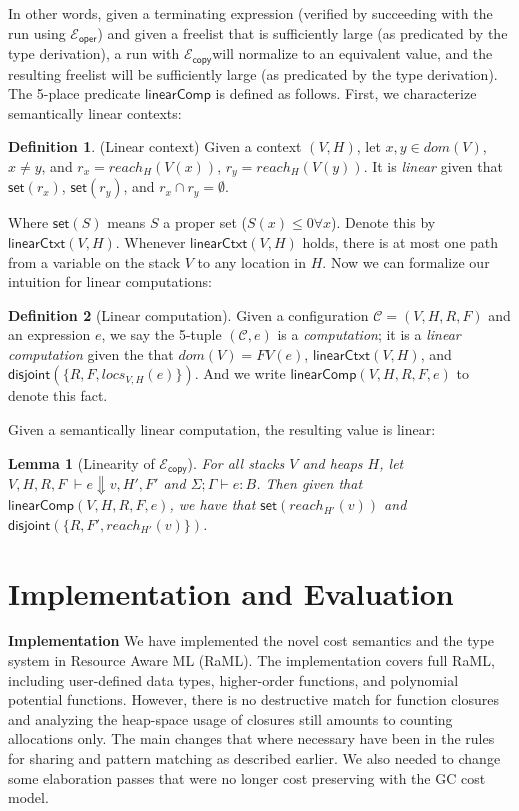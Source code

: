 \documentclass{easychair}
\newcommand{\ms}[1]{\ensuremath{\mathsf{#1}}}
\newcounter{rule}
\newcommand{\na}[1]{\mathsf{linearCtxt}(#1)}
\newcommand{\dist}[1]{\mathsf{disjoint}(#1)}
\newcommand{\wfc}[5]{\mathsf{linearComp}(#1,#2,#3,#4,#5)}
\newcommand{\copySem}{\ensuremath{\mathcal{E}_{\ms{copy}}}}
\newtheorem{lemma}[theorem]{Lemma}
\theoremstyle{definition}
\newtheorem{definition}{Definition}
\begin{document}
In other words, given a terminating expression (verified by succeeding with the run using $\mathcal{E}_{\ms{oper}}$)
and given a freelist that is sufficiently large (as predicated by the type derivation), 
a run with \copySem will normalize to an equivalent value, and the resulting freelist 
will be sufficiently large (as predicated by the type derivation). The 5-place predicate
$\ms{linearComp}$ 
is defined as follows. First, we characterize semantically linear contexts: 

\begin{definition}(Linear context)
Given a context $(V,H)$, let
$x,y \in dom(V)$, $x \ne y$, and $r_x = reach_H(V(x))$, $r_y = reach_H(V(y))$.
	It is \emph{linear} given that  $\ms{set}(r_x)$, $\ms{set}(r_y)$, and $r_x \cap r_y = \emptyset$.
\end{definition}

Where $\ms{set}(S)$ means $S$ a proper set ($S(x) \le 0 \forall x$). 
Denote this by $\na{V,H}$. Whenever $\na{V,H}$ holds,
there is at 
most one path from a variable on the stack $V$ to any location in $H$. Now we can 
formalize our intuition for linear computations: 

\begin{definition}[Linear computation]
Given a configuration $\mathcal{C} = (V,H,R,F)$ and an expression $e$, 
we say the 5-tuple $(\mathcal{C},e)$ is a \emph{computation}; it is a \emph{linear computation} 
given the that  $dom(V) = FV(e)$, $\na{V,H}$, and $\dist{\{R,F,locs_{V,H}(e)\}}$.
And we write $\wfc{V}{H}{R}{F}{e}$ to denote this fact.
\end{definition}

Given a semantically linear computation, the resulting value is linear: 
\begin{lemma}[Linearity of \copySem]\label{itm:na}
For all stacks $V$ and heaps $H$, let  $V,H,R,F \; \vdash e \Downarrow v, H', F'$ 
and $\Sigma; \Gamma \vdash e : B$. Then given that $\wfc{V}{H}{R}{F}{e}$, we have that $\ms{set}(reach_{H'}(v))$ and $\dist{\{R,F',reach_{H'}(v)\}}$.
\end{lemma}


\section{Implementation and Evaluation}
\label{sect:implementation}

{\bf Implementation}
We have implemented the novel cost semantics and the type system in
Resource Aware ML (RaML). The implementation covers full RaML,
including user-defined data types, higher-order functions, and
polynomial potential functions. However, there is no destructive match
for function closures and analyzing the heap-space usage of closures
still amounts to counting allocations only. The main changes that
where necessary have been in the rules for sharing and pattern
matching as described earlier. We also needed to change some
elaboration passes that were no longer cost preserving with
the GC cost model.
\end{document}
